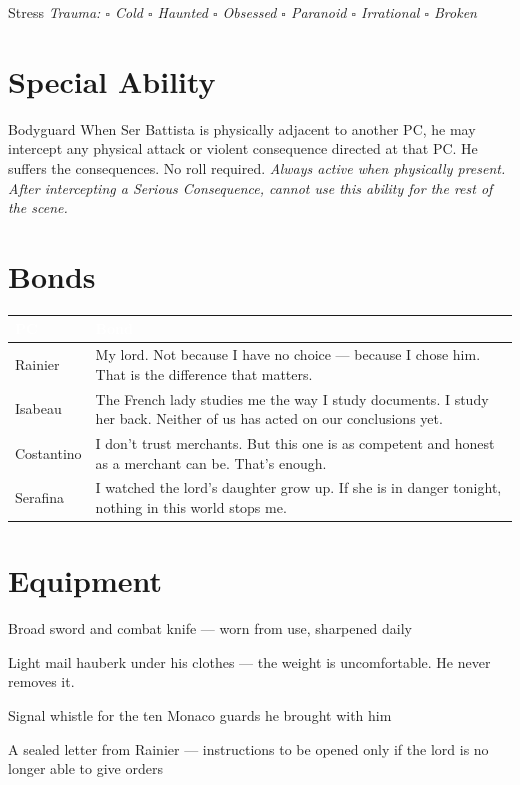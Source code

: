 \medskip
\begin{pgclockbox}{Stress \hfill {}}
\small\textit{Trauma: $\square$ Cold \quad $\square$ Haunted \quad $\square$ Obsessed \quad $\square$ Paranoid \quad $\square$ Irrational \quad $\square$ Broken}
\end{pgclockbox}

\section*{Special Ability}
\begin{grimaldibox}{Bodyguard}
When Ser Battista is physically adjacent to another PC, he may intercept any
physical attack or violent consequence directed at that PC. He suffers the
consequences. No roll required.
\textit{Always active when physically present. After intercepting a Serious
Consequence, cannot use this ability for the rest of the scene.}
\end{grimaldibox}

\section*{Bonds}
\begin{table}[h]\centering\renewcommand{\arraystretch}{1.4}
\begin{tabularx}{\linewidth}{@{}L{2.6cm} X@{}}
\toprule{}
\textcolor{white}{\textbf{PC}} & \textcolor{white}{\textbf{Bond}} \\
\midrule
Rainier & My lord. Not because I have no choice --- because I chose him. That is the difference that matters. \\
Isabeau & The French lady studies me the way I study documents. I study her back. Neither of us has acted on our conclusions yet. \\
Costantino & I don't trust merchants. But this one is as competent and honest as a merchant can be. That's enough. \\
Serafina & I watched the lord's daughter grow up. If she is in danger tonight, nothing in this world stops me. \\
\bottomrule
\end{tabularx}
\end{table}

\section*{Equipment}
\begin{goldlist}
\item Broad sword and combat knife --- worn from use, sharpened daily
\item Light mail hauberk under his clothes --- the weight is uncomfortable. He never removes it.
\item Signal whistle for the ten Monaco guards he brought with him
\item A sealed letter from Rainier --- instructions to be opened only if the lord is no longer able to give orders
\end{goldlist}

